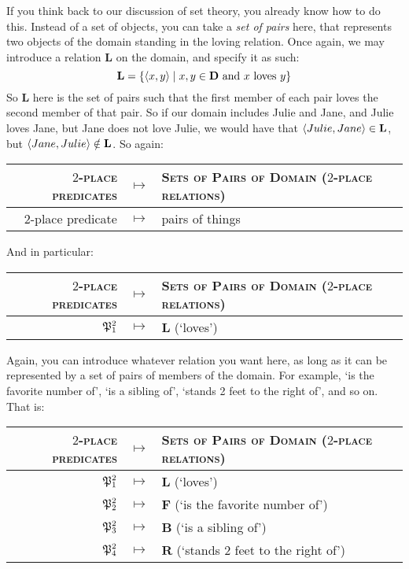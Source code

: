 If you think back to our discussion of set theory, you already know how to do this. Instead of a set of objects, you can take a \textit{set of pairs} here, that represents two objects of the domain standing in the loving relation. Once again, we may introduce a relation $\mathbf{L}$ on the domain, and specify it as such: 
\[
\mathbf{L}=\{\langle x, y\rangle \mid x,y \in \mathbf{D} \text{ and } x\text{ loves }y\} 
\]
So $\mathbf{L}$ here is the set of pairs such that the first member of each pair loves the second member of that pair. So if our domain includes Julie and Jane, and Julie loves Jane, but Jane does not love Julie, we would have that $\langle Julie, Jane\rangle \in \mathbf{L}$, but $\langle Jane, Julie\rangle \notin \mathbf{L}$. So again:

\begin{center}
	\begin{tabular}{rcl}
		$2$-\textsc{place predicates} & $\mapsto$ & \textsc{Sets of Pairs of Domain ($2$-place relations)}\\\hline
		$2$-place predicate & $\mapsto$ & pairs of things
	\end{tabular}
\end{center} 

And in particular: 

\begin{center}
	\begin{tabular}{rcl}
		$2$-\textsc{place predicates} & $\mapsto$ & \textsc{Sets of Pairs of Domain ($2$-place relations)}\\\hline
		$\mathfrak{P}^{2}_{1}$ & $\mapsto$ & $\mathbf{L}$ (`loves')
	\end{tabular}
\end{center} 

Again, you can introduce whatever relation you want here, as long as it can be represented by a set of pairs of members of the domain. For example, `is the favorite number of', `is a sibling of', `stands 2 feet to the right of', and so on. That is: 

\begin{center}
	\begin{tabular}{rcl}
		$2$-\textsc{place predicates} & $\mapsto$ & \textsc{Sets of Pairs of Domain ($2$-place relations)}\\\hline
		$\mathfrak{P}^{2}_{1}$ & $\mapsto$ & $\mathbf{L}$ (`loves')\\
		$\mathfrak{P}^{2}_{2}$ & $\mapsto$ & $\mathbf{F}$ (`is the favorite number of')\\
		$\mathfrak{P}^{2}_{3}$ & $\mapsto$ & $\mathbf{B}$ (`is a sibling of')\\
		$\mathfrak{P}^{2}_{4}$ & $\mapsto$ & $\mathbf{R}$ (`stands 2 feet to the right of')
	\end{tabular}
\end{center} 

